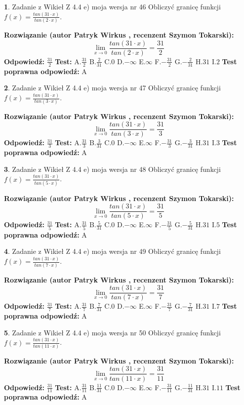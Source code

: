\documentclass[12pt, a4paper]{article}
\theoremstyle{definition} %
\newtheorem{zad}{}
\newcommand{\zadStart}[1]{\begin{zad}#1\newline}
\newcommand{\zadStop}{\end{zad}}
\newcommand{\rozwStart}[2]{\noindent \textbf{Rozwiązanie (autor #1 , recenzent #2): }\newline}
\newcommand{\rozwStop}{\newline}
\newcommand{\odpStart}{\noindent \textbf{Odpowiedź:}\newline}
\newcommand{\odpStop}{\newline}
\newcommand{\testStart}{\noindent \textbf{Test:}\newline}
\newcommand{\testStop}{\newline}
\newcommand{\kluczStart}{\noindent \textbf{Test poprawna odpowiedź:}\newline}
\newcommand{\kluczStop}{\newline}
\begin{document}
\zadStart{Zadanie z Wikieł Z 4.4 e) moja wersja nr 46}
Obliczyć granicę funkcji $f(x)=\frac{tan(31\cdot x)}{tan(2\cdot x)}$.
\zadStop
\rozwStart{Patryk Wirkus}{Szymon Tokarski}
$$\lim\limits_{x\to 0}\frac{tan(31\cdot x)}{tan(2\cdot x)}=
\frac{31}{2}$$
\rozwStop
\odpStart
$\frac{31}{2}$
\odpStop
\testStart
A.$\frac{31}{2}$
B.$\frac{2}{31}$
C.$0$
D.$-\infty$
E.$\infty$
F.$-\frac{31}{2}$
G.$-\frac{2}{31}$
H.$31$
I.$2$
\testStop
\kluczStart
A
\kluczStop



\zadStart{Zadanie z Wikieł Z 4.4 e) moja wersja nr 47}
Obliczyć granicę funkcji $f(x)=\frac{tan(31\cdot x)}{tan(3\cdot x)}$.
\zadStop
\rozwStart{Patryk Wirkus}{Szymon Tokarski}
$$\lim\limits_{x\to 0}\frac{tan(31\cdot x)}{tan(3\cdot x)}=
\frac{31}{3}$$
\rozwStop
\odpStart
$\frac{31}{3}$
\odpStop
\testStart
A.$\frac{31}{3}$
B.$\frac{3}{31}$
C.$0$
D.$-\infty$
E.$\infty$
F.$-\frac{31}{3}$
G.$-\frac{3}{31}$
H.$31$
I.$3$
\testStop
\kluczStart
A
\kluczStop



\zadStart{Zadanie z Wikieł Z 4.4 e) moja wersja nr 48}
Obliczyć granicę funkcji $f(x)=\frac{tan(31\cdot x)}{tan(5\cdot x)}$.
\zadStop
\rozwStart{Patryk Wirkus}{Szymon Tokarski}
$$\lim\limits_{x\to 0}\frac{tan(31\cdot x)}{tan(5\cdot x)}=
\frac{31}{5}$$
\rozwStop
\odpStart
$\frac{31}{5}$
\odpStop
\testStart
A.$\frac{31}{5}$
B.$\frac{5}{31}$
C.$0$
D.$-\infty$
E.$\infty$
F.$-\frac{31}{5}$
G.$-\frac{5}{31}$
H.$31$
I.$5$
\testStop
\kluczStart
A
\kluczStop



\zadStart{Zadanie z Wikieł Z 4.4 e) moja wersja nr 49}
Obliczyć granicę funkcji $f(x)=\frac{tan(31\cdot x)}{tan(7\cdot x)}$.
\zadStop
\rozwStart{Patryk Wirkus}{Szymon Tokarski}
$$\lim\limits_{x\to 0}\frac{tan(31\cdot x)}{tan(7\cdot x)}=
\frac{31}{7}$$
\rozwStop
\odpStart
$\frac{31}{7}$
\odpStop
\testStart
A.$\frac{31}{7}$
B.$\frac{7}{31}$
C.$0$
D.$-\infty$
E.$\infty$
F.$-\frac{31}{7}$
G.$-\frac{7}{31}$
H.$31$
I.$7$
\testStop
\kluczStart
A
\kluczStop



\zadStart{Zadanie z Wikieł Z 4.4 e) moja wersja nr 50}
Obliczyć granicę funkcji $f(x)=\frac{tan(31\cdot x)}{tan(11\cdot x)}$.
\zadStop
\rozwStart{Patryk Wirkus}{Szymon Tokarski}
$$\lim\limits_{x\to 0}\frac{tan(31\cdot x)}{tan(11\cdot x)}=
\frac{31}{11}$$
\rozwStop
\odpStart
$\frac{31}{11}$
\odpStop
\testStart
A.$\frac{31}{11}$
B.$\frac{11}{31}$
C.$0$
D.$-\infty$
E.$\infty$
F.$-\frac{31}{11}$
G.$-\frac{11}{31}$
H.$31$
I.$11$
\testStop
\kluczStart
A
\kluczStop
\end{document}
